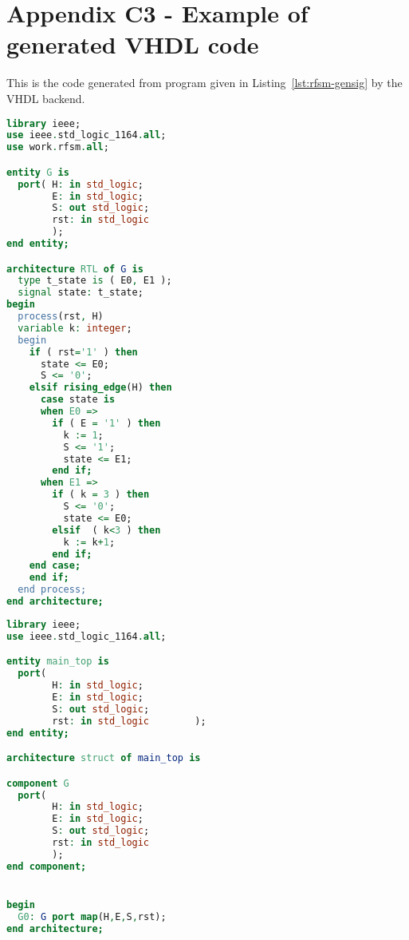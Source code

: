 \chapter*{Appendix C3 - Example of generated VHDL code}  
\label{cha:ex1-vhdl}

This is the code generated from program given in Listing~\ref{lst:rfsm-gensig} by the VHDL backend.

\begin{lstlisting}[language=VHDL,frame=single,numbers=none,basicstyle=\small,caption=File g.vhd]
library ieee;
use ieee.std_logic_1164.all;
use work.rfsm.all;

entity G is
  port( H: in std_logic;
        E: in std_logic;
        S: out std_logic;
        rst: in std_logic
        );
end entity;

architecture RTL of G is
  type t_state is ( E0, E1 );
  signal state: t_state;
begin
  process(rst, H)
  variable k: integer;
  begin
    if ( rst='1' ) then
      state <= E0;
      S <= '0';
    elsif rising_edge(H) then 
      case state is
      when E0 =>
        if ( E = '1' ) then
          k := 1;
          S <= '1';
          state <= E1;
        end if;
      when E1 =>
        if ( k = 3 ) then
          S <= '0';
          state <= E0;
        elsif  ( k<3 ) then
          k := k+1;
        end if;
    end case;
    end if;
  end process;
end architecture;

\end{lstlisting}

\begin{lstlisting}[language=VHDL,frame=single,numbers=none,basicstyle=\small,caption=File main_top.vhd]
library ieee;
use ieee.std_logic_1164.all;	   

entity main_top is
  port(
        H: in std_logic;
        E: in std_logic;
        S: out std_logic;
        rst: in std_logic        );
end entity;

architecture struct of main_top is

component G 
  port(
        H: in std_logic;
        E: in std_logic;
        S: out std_logic;
        rst: in std_logic
        );
end component;


begin
  G0: G port map(H,E,S,rst);
end architecture;
\end{lstlisting}


